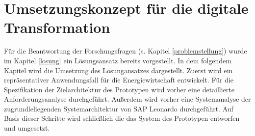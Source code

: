 \section{Umsetzungskonzept für die digitale Transformation}

Für die Beantwortung der Forschungsfragen (s. Kapitel \ref{problemstellung}) wurde im Kapitel \ref{losung} ein Lösungsansatz bereits vorgestellt. In dem folgendem Kapitel wird die Umsetzung des Lösungansatzes dargestellt. Zuerst wird ein repräsentativer Anwendungsfall für die Energiewirtschaft entwickelt. Für die Spezifikation der Zielarchitektur des Prototypen wird vorher eine detaillierte Anforderungsanalyse durchgeführt. Außerdem wird vorher eine Systemanalyse der zugrundleliegenden Systemarchitektur von SAP Leonardo durchgeführt. Auf Basis dieser Schritte wird schließlich die das System des Prototypen entworfen und umgesetzt. 

 
 
 




